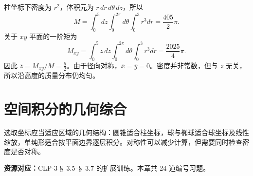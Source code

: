 \documentclass[12pt,fontset=fandol]{ctexart}
\begin{document}
\begin{solve}\label{ans:c38q24}
柱坐标下密度为 $r^2$，体积元为 $r\,dr\,d\theta\,dz$，所以
\[
M=\int_0^{5}dz\int_0^{2\pi}d\theta\int_0^{3}r^3dr=\frac{405}{2}\pi.
\]
关于 $xy$ 平面的一阶矩为
\[
M_{xy}=\int_0^{5}z\,dz\int_0^{2\pi}d\theta\int_0^{3}r^3dr=\frac{2025}{4}\pi.
\]
因此 $\bar z=M_{xy}/M=\frac{5}{2}$。由于径向对称，$\bar x=\bar y=0$。密度并非常数，但与 $z$ 无关，所以沿高度的质量分布仍均匀。
\end{solve}

\clearpage
\section{空间积分的几何综合}\label{sec:ch39}
选取坐标应当适应区域的几何结构：圆锥适合柱坐标，球与椭球适合球坐标及线性缩放，单纯形适合按平面边界逐层积分。对称性可以减少计算，但需要同时检查密度是否对称。

\textbf{资源对应：}CLP-3 \S~3.5--\S~3.7 的扩展训练。本章共 24 道编号习题。
\end{document}

